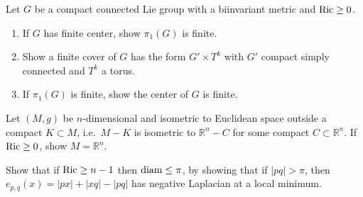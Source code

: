 \begin{remark}
  \label{rem:pet-ch7-ex-20}
  Let $G$ be a compact connected Lie group with a biinvariant metric and
  $\operatorname{Ric}\ge0$.
  \begin{enumerate}
    \item[(1)] If $G$ has finite center, show $\pi_1(G)$ is finite.
    \item[(2)] Show a finite cover of $G$ has the form $G'\times T^k$ with
      $G'$ compact simply connected and $T^k$ a torus.
    \item[(3)] If $\pi_1(G)$ is finite, show the center of $G$ is finite.
  \end{enumerate}
\end{remark}

\begin{remark}
  \label{rem:pet-ch7-ex-21}
  Let $(M,g)$ be $n$-dimensional and isometric to Euclidean space outside a
  compact $K\subset M$, i.e.\ $M-K$ is isometric to $\mathbb{R}^n-C$ for some
  compact $C\subset\mathbb{R}^n$. If $\operatorname{Ric}\ge0$, show $M=\mathbb{R}^n$.
\end{remark}

\begin{remark}
  \label{rem:pet-ch7-ex-22}
  Show that if $\operatorname{Ric}\ge n-1$ then $\operatorname{diam}\le\pi$, by showing that if
  $|pq|>\pi$, then $e_{p,q}(x)=|px|+|xq|-|pq|$ has negative Laplacian at a
  local minimum.
\end{remark}
